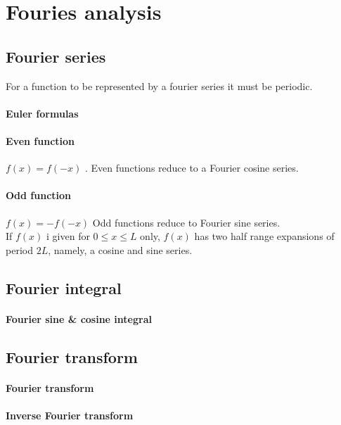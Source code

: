 \section{Fouries analysis}

\subsection{Fourier series}
For a function to be represented by a fourier series it must be
periodic.

\paragraph{Euler formulas}
\paragraph{Even function} $f(x) = f(-x)$ . Even functions reduce to a Fourier cosine series.
\paragraph{Odd function}  $f(x) = - f(-x)$ Odd functions reduce to
Fourier sine series.
\\

If $f(x)$ i given for $0 \leq x \leq L$ only, $f(x)$ has two half
range expansions of period $2L$, namely, a cosine and sine series.

\subsection{Fourier integral}
\paragraph{Fourier sine \& cosine integral}

\subsection{Fourier transform}

\paragraph{Fourier transform}
\paragraph{Inverse Fourier transform}
